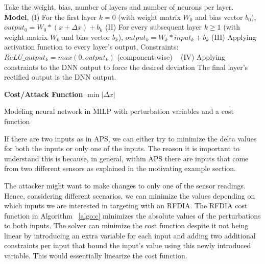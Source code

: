 \begin{algorithm}
	Take the weight, bias, number of layers and number of neurons per layer. \\
	
	\textbf{Model}, \linebreak
	(I) For the first layer $k = 0$ (with weight matrix $W_0$ and bias vector $b_0$), $output_0 = W_0 * (x + \Delta x) + b_k$
	\linebreak
	(II) For every subsequent layer $k \geq 1$ (with weight matrix $W_k$ and bias vector $b_k$), $output_k = W_k * input_k + b_k$
	\linebreak
	(III) Applying activation function to every layer's output,
	\linebreak
	Constraints: $ReLU\_output_k = max(0, output_k)$ (component-wise) \
	\linebreak
	(IV) Applying constraints to the DNN output to force the desired deviation
	\linebreak
	The final layer's rectified output is the DNN output.
	
	\textbf{Cost/Attack Function} \linebreak
	$\min |\Delta x|$
	\caption{Modeling neural network in MILP with perturbation variables and a cost function}
	\label{algo:c}
\end{algorithm}

If there are two inputs as in \ac{APS}, we can either try to minimize the delta values for both the inputs or only one of the inputs. 
The reason it is important to understand this is because, in general, within \ac{APS} there are inputs that come from two different sensors as explained in the motivating example section. 

The attacker might want to make changes to only one of the sensor readings. Hence, considering different scenarios, we can minimize the values depending on which inputs we are interested in targeting with an \ac{RFDIA}. 
The \ac{RFDIA} cost function in Algorithm ~\ref{algo:c} minimizes the absolute values of the perturbations to both inputs.
The solver can minimize the cost function despite it not being linear by introducing an extra variable for each input and adding two additional constraints per input that bound the input's value using this newly introduced variable. 
This would essentially linearize the cost function.


